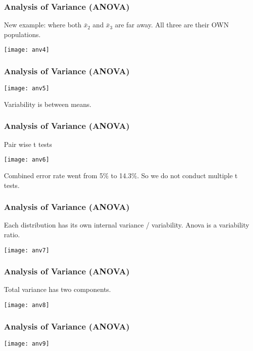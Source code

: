 \begin{frame}[fragile]\frametitle{Analysis of Variance (ANOVA)}
New example: where both $\bar{x}_2$ and $\bar{x}_3$  are far away. All three are their OWN populations.

\begin{center}
\texttt{[image: anv4]}
\end{center}

\end{frame}

\begin{frame}[fragile]\frametitle{Analysis of Variance (ANOVA)}
\begin{center}
\texttt{[image: anv5]}
\end{center}
Variability is between means.
\end{frame}

\begin{frame}[fragile]\frametitle{Analysis of Variance (ANOVA)}
Pair wise t tests
\begin{center}
\texttt{[image: anv6]}
\end{center}
Combined error rate went from 5\% to 14.3\%. So we do not conduct multiple t tests.
\end{frame}

\begin{frame}[fragile]\frametitle{Analysis of Variance (ANOVA)}
Each distribution has its own internal variance / variability. Anova is a variability ratio.
\begin{center}
\texttt{[image: anv7]}
\end{center}
\end{frame}

\begin{frame}[fragile]\frametitle{Analysis of Variance (ANOVA)}
Total variance has two components.
\begin{center}
\texttt{[image: anv8]}
\end{center}
\end{frame}

\begin{frame}[fragile]\frametitle{Analysis of Variance (ANOVA)}
\begin{center}
\texttt{[image: anv9]}
\end{center}
\end{frame}

